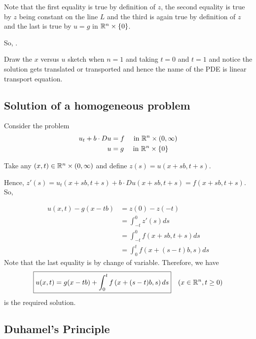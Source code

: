 Note that the first equality is true by definition of $z$, the second equality is true by $z$ being constant on the line $L$ and the third is again true by definition of $z$ and the last is true by $u=g$ in $\mathbb R ^n \times \left\{ 0 \right\}$.

So, .

\begin{remark}
    Draw the $x$ versus $u$ sketch when $n=1$ and taking $t=0$ and $t=1$ and notice the solution gets translated or transported and hence the name of the PDE is linear transport equation.
\end{remark}

\subsection{Solution of a homogeneous problem}
Consider the problem
\begin{align*}
    u_t + b\cdot Du &= f \quad \text{ in } \mathbb R ^n \times (0,\infty ) \\
    u &= g \quad \text{ in } \mathbb R^n \times \left\{ 0 \right\}
\end{align*}
 
Take any $\left( x,t \right) \in \mathbb R ^n \times \left( 0, \infty \right)$ and define $z(s)= u (x+sb, t+s)$.

Hence, $z'(s) = u_t (x+sb, t+s ) + b \cdot Du (x+sb, t+s) = f(x+sb , t+s )$. So,

\begin{align*}
    u(x,t)-g(x-tb) &= z(0) - z(-t) \\
    &= \int_{-t}^{0} z'(s) ds \\
    &= \int_{-t}^{0} f\left( x+sb, t+s \right) ds \\
    &= \int_{0}^{t} f\left( x+(s-t)b, s \right) ds
\end{align*}
Note that the last equality is by change of variable. Therefore, we have 
\begin{equation*}
    \boxed{u(x,t)=g(x-tb)+\int_{0}^{t} f\left( x+(s-t)b, s\right) ds} \quad (x\in \mathbb R ^n , t \ge 0)
\end{equation*}
is the required solution.


\subsection{Duhamel's Principle}
